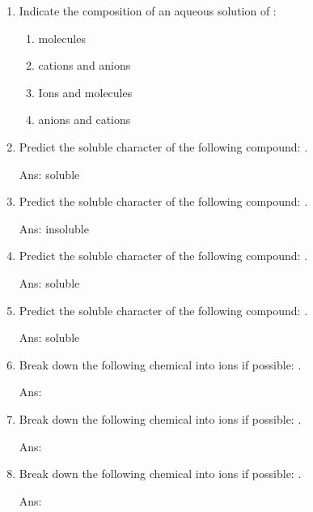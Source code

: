 \documentclass[main.tex]{subfiles}
\begin{document}
\begin{multicols*}{2}
\begin{enumerate}
\item Indicate the composition of an aqueous solution of :
\begin{enumerate}[label=(\alph*)]
\item {} molecules  %
\item {} cations and  anions   %
\item   Ions and molecules %
\item   {} anions and  cations %
\end{enumerate}


\item Predict the soluble character of the following compound: .
\begin{flushright}\small Ans: soluble\end{flushright}


\item Predict the soluble character of the following compound: .
\begin{flushright}\small Ans:  insoluble\end{flushright}

\item Predict the soluble character of the following compound: .
\begin{flushright}\small Ans:  soluble\end{flushright}

\item Predict the soluble character of the following compound: .
\begin{flushright}\small Ans:  soluble\end{flushright}

\item Break down the following chemical into ions if possible: .
\begin{flushright}\small Ans:  \end{flushright}


\item Break down the following chemical into ions if possible: .
\begin{flushright}\small Ans:  \end{flushright}


\item Break down the following chemical into ions if possible: .
\begin{flushright}\small Ans: \end{flushright}


\end{enumerate}
\end{multicols*}
\end{document}
